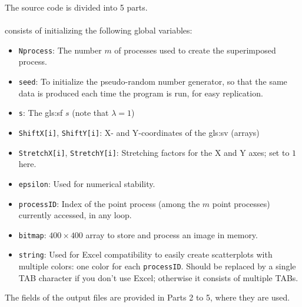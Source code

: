 \documentclass[10pt]{article}
\begin{document}
\noindent The source code is divided into 5 parts.  \\
\quad \\
 consists of initializing the following global variables:
\begin{itemize}
\item \texttt{Nprocess}: The number $m$ of processes used to create the superimposed process.
\item \texttt{seed}: To initialize the pseudo-random number generator, so that the same data is produced each time the program is run, for easy replication.
\item \texttt{s}: The \gls{gls:sf} $s$ (note that $\lambda = 1$) 
\item \texttt{ShiftX[i]}, \texttt{ShiftY[i]}: X- and Y-coordinates of the \gls{gls:sv} (arrays)
\item \texttt{StretchX[i]}, \texttt{StretchY[i]}:  \textcolor{index}{Stretching factors} for the X and Y axes; set to $1$ here.
\item \texttt{epsilon}: Used for numerical stability.
\item \texttt{processID}: Index of the point process (among the $m$ point processes) currently accessed, in any loop.
\item \texttt{bitmap}: $400 \times 400$ array to store and process an image in memory.
\item \texttt{string}: Used for Excel compatibility to easily create scatterplots with multiple colors: one color for each \texttt{processID}. Should be replaced 
by a single TAB character if you don't use Excel; otherwise it consists of multiple TABs.
\end{itemize}
\noindent The fields of the output files are provided in Parts 2 to 5, where they are used.
\end{document}
